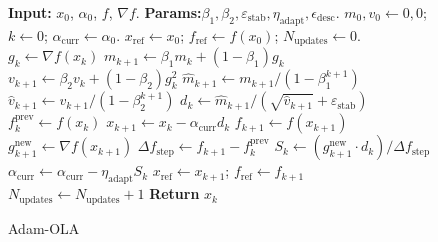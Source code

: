 \documentclass{article}
\begin{document}
\begin{figure}[H]
\begin{minipage}[t]{0.5\textwidth}
    \end{minipage}
    \hfill %
    \begin{minipage}[t]{0.49\textwidth} %
        \vspace{-10pt} %
        \begin{algorithm}[H]
            \caption{Adam-OLA}
            \label{alg:adam_ola}
            \begin{algorithmic}[1]
                \State \textbf{Input:} $x_0$, $\alpha_0$, $f$, $\nabla f$.
                \State \textbf{Params:}$\beta_1, \beta_2, \varepsilon_{\text{stab}},\eta_{\text{adapt}}, \epsilon_{\text{desc}}$.
                \State $m_0, v_0 \gets 0, 0$; $k \gets 0$; $\alpha_{\text{curr}} \gets \alpha_0$.
                \State $x_{\text{ref}} \gets x_0$; $f_{\text{ref}} \gets f(x_0)$; $N_{\text{updates}} \gets 0$.
                    \State $g_k \gets \nabla f(x_k)$
                    \State $m_{k+1} \gets \beta_1 m_k + (1-\beta_1) g_k$
                    \State $v_{k+1} \gets \beta_2 v_k + (1-\beta_2) g_k^2$
                    \State $\hat{m}_{k+1} \gets m_{k+1}/(1-\beta_1^{k+1})$
                    \State $\hat{v}_{k+1} \gets v_{k+1}/(1-\beta_2^{k+1})$
                    \State $d_k \gets \hat{m}_{k+1} / (\sqrt{\hat{v}_{k+1}} + \varepsilon_{\text{stab}})$
                    \State $f_k^{\text{prev}} \gets f(x_k)$
                    \State $x_{k+1} \gets x_k - \alpha_{\text{curr}} d_k$
                    \State $f_{k+1} \gets f(x_{k+1})$
                     \label{algoline:adapt_cond_varphi_concise}
                        \State $g_{k+1}^{\text{new}} \gets \nabla f(x_{k+1})$
                        \State $\Delta f_{\text{step}} \gets f_{k+1} - f_k^{\text{prev}}$
                            \State $S_k \gets (g_{k+1}^{\text{new}} \cdot d_k) / \Delta f_{\text{step}}$
                            \State $\alpha_{\text{curr}} \gets \alpha_{\text{curr}} - \eta_{\text{adapt}} S_k$
                        \EndIf
                        \State $x_{\text{ref}} \gets x_{k+1}$; $f_{\text{ref}} \gets f_{k+1}$
                        \State $N_{\text{updates}} \gets N_{\text{updates}} + 1$
                    \EndIf
                \EndFor
                \State \textbf{Return} $x_k$
            \end{algorithmic}
        \end{algorithm}
    \end{minipage}
\end{figure}
\end{document}
